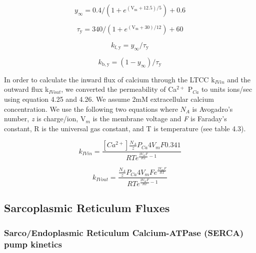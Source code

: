 \documentclass[12pt]{ucsddissertation}
\begin{document}
\begin{equation}
y _ { \infty } = 0.4 / \left( 1 + e ^ { \left( \mathrm { V } _ { \mathrm { m } } + 12.5 \right) / 5 } \right) + 0.6
\end{equation}

\begin{equation}
\tau _ { \mathrm { y } } = 340 / \left( 1 + e ^ { \left( \mathrm { V } _ { \mathrm { m } } + 30 \right) / 12 } \right) + 60
\end{equation}

\begin{equation}
k _ { \mathrm { f } , \mathrm { y } } = y _ { \infty } / \tau _ { \mathrm { y } }
\end{equation}

\begin{equation}
k _ { \mathrm { b } , \mathrm { y } } = \left( 1 - y _ { \infty } \right) / \tau _ { \mathrm { y } }
\end{equation}


In order to calculate the inward flux of calcium through the LTCC k$_{IVin}$ and the outward flux k$_{IVout}$, we  converted the permeability of Ca$^{2+}$ P$_{Ca}$ to units ions/sec using equation 4.25 and 4.26. We assume 2mM extracellular calcium concentration. We use the following two equations where $N_{A}$ is Avogadro's number, \textit{z} is charge/ion,  V$_{m}$ is the membrane voltage and \textit{F} is Faraday's constant, R is the universal gas constant, and T is temperature (see table 4.3).


\begin{equation}
 k_{IVin} =\frac {[Ca^{2+}] \frac{N_{A}}{z} P_{Ca}4V_{m}F0.341}{RTe^{\frac {2V_{m}F}{RT}-1}}
\end{equation}


\begin{equation}
 k_{IVout} =\frac {\frac{N_{A}}{z} P_{Ca}4V_{m}Fe^{\frac {2V_{m}F}{RT}}}{RTe^{\frac {2V_{m}F}{RT}-1}}
\end{equation}


\subsection{Sarcoplasmic Reticulum Fluxes}
\subsubsection{Sarco/Endoplasmic Reticulum Calcium-ATPase (SERCA) pump kinetics}
\end{document}
